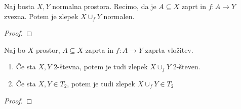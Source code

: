 \begin{izrek}
    Naj bosta \(X, Y\) normalna prostora. Recimo, da je \(A \subseteq X\) zaprt in \(f: A \to Y\) zvezna. Potem je zlepek \(X \cup_f Y\) normalen.
\end{izrek}

\begin{proof}
    \todo{}
\end{proof}

\begin{trditev}
    Naj bo \(X\) prostor, \(A \subseteq X\) zaprta in \(f: A \to Y\) zaprta vložitev.
    \begin{enumerate}
        \item Če sta \(X, Y\) \(2\)-števna, potem je tudi zlepek \(X \cup_f Y\) \(2\)-števen.
        \item Če sta \(X, Y \in T_2\), potem je tudi zlepek  \(X \cup_f Y \in T_2\)
    \end{enumerate}
\end{trditev}

\begin{proof}
    \todo{}
\end{proof}